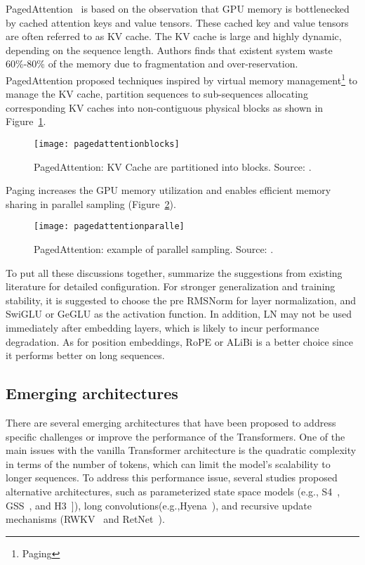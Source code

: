PagedAttention~\cite{vllm2023} is based on the observation that GPU memory is bottlenecked by cached attention keys and value tensors.
These cached key and value tensors are often referred to as KV cache.
The KV cache is large and highly dynamic, depending on the sequence length.
Authors finds that existent system waste 60\%-80\% of the memory due to fragmentation and over-reservation.
PagedAttention proposed techniques inspired by virtual memory management\footnote{Paging} to manage the KV cache, partition sequences to sub-sequences allocating corresponding KV caches into non-contiguous physical blocks as shown in Figure~\ref{fig:paging}.

\begin{figure}[h]
	\centering
	\texttt{[image: pagedattentionblocks]}
	\caption{PagedAttention: KV Cache are partitioned into blocks. Source: \textcite{vllm2023}.}
	\label{fig:paging}
\end{figure}

Paging increases the GPU memory utilization and enables efficient memory sharing in parallel sampling (Figure~\ref{fig:paging-parallel}).

\begin{figure}[h]
	\centering
	\texttt{[image: pagedattentionparalle]}
	\caption{PagedAttention: example of parallel sampling. Source: \textcite{vllm2023}.}
	\label{fig:paging-parallel}
\end{figure}

To put all these discussions together, \textcite{survey} summarize the suggestions from existing literature for detailed configuration.
For stronger generalization and training stability, it is suggested to choose the pre RMSNorm for layer normalization, and SwiGLU or GeGLU as the activation function.
In addition, LN may not be used immediately after embedding layers, which is likely to incur performance degradation.
As for position embeddings, RoPE or ALiBi is a better choice since it performs better on long sequences.

\subsection{Emerging architectures}
\label{subsec:emerging-architectures}

There are several emerging architectures that have been proposed to address specific challenges or improve the performance of the Transformers.
One of the main issues with the vanilla Transformer architecture is the quadratic complexity in terms of the number of tokens, which can limit the model's scalability to longer sequences.
To address this performance issue, several studies proposed alternative architectures, such as parameterized state space models (e.g., S4~\cite{gu2022efficiently}, GSS~\cite{mehta2022long}, and H3~\cite{dao2022hungry}]), long convolutions(e.g.,Hyena~\cite{poli2023hyena}), and recursive update mechanisms (RWKV~\cite{peng2023rwkv} and RetNet~\cite{sun2023retentive}).